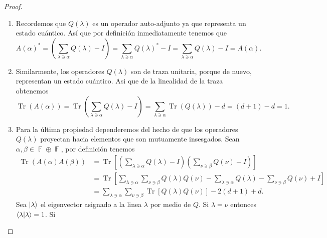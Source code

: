 \documentclass[a4paper,11pt]{report}
\DeclareMathOperator{\F}{\mathbb{F}}
\DeclareMathOperator{\Tr}{Tr}
\begin{document}
  \begin{proof}
    ${}$
    \begin{enumerate}
      \item Recordemos que $Q(\lambda)$ es un operador
        auto-adjunto ya que representa un estado cuántico.
        Así que por definición inmediatamente tenemos que
        \begin{equation}
          A(\alpha)^{*}
          = \left( \sum_{\lambda \ni \alpha}^{} Q(\lambda)
          - I\right)
          = \sum_{\lambda \ni \alpha}^{} Q(\lambda)^{*} - I
          = \sum_{\lambda \ni \alpha}^{} Q(\lambda) - I
          = A(\alpha).
        \end{equation}
      \item Similarmente, los operadores $Q(\lambda)$ son de
        traza unitaria, porque de nuevo, representan un
        estado cuántico. Asi que de la linealidad de la
        traza obtenemos
        \begin{equation}
          \Tr(A(\alpha))
          = \Tr\left( \sum_{\lambda \ni \alpha}^{}
          Q(\lambda) - I \right) 
          = \sum_{\lambda \ni \alpha}^{} \Tr(Q(\lambda)) - d
          = (d+1) - d
          = 1.
        \end{equation}
      \item Para la última propiedad dependeremos del hecho
        de que los operadores $Q(\lambda)$ proyectan hacia
        elementos que son mutuamente insesgados. Sean
        $\alpha, \beta \in \F \oplus \F$, por definición
        tenemos
        \begin{align}
          \Tr\left( A(\alpha)A(\beta) \right) 
          &= \Tr\left[
            \left(
              \sum_{\lambda \ni \alpha}^{} Q(\lambda) - I
            \right) 
            \left( 
              \sum_{\nu \ni \beta}^{} Q(\nu) - I
            \right) 
          \right] \\
          &= \Tr\left[
            \sum_{\lambda \ni \alpha}^{}
            \sum_{\nu \ni \beta}^{}
            Q(\lambda)Q(\nu) - \sum_{\lambda \ni \alpha}^{}
            Q(\lambda) - \sum_{\nu \ni \beta}^{} Q(\nu) + I
          \right] \\
          &= \sum_{\lambda \ni \alpha}^{} 
          \sum_{\nu \ni \beta}^{}
          \Tr\left[Q(\lambda)Q(\nu)\right]
          - 2(d+1) + d. \label{eqn:trace_point_ops}
        \end{align}
        Sea $\ket \lambda$ el eigenvector asignado a la
        linea $\lambda$ por medio de $Q$.  Si $\lambda =
        \nu$ entonces $\braket{\lambda|\lambda} = 1$. Si

\end{enumerate}
\end{proof}
\end{document}
